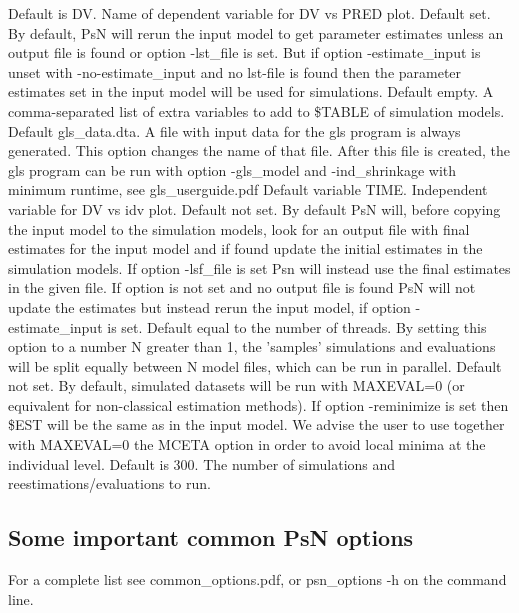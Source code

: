 \begin{optionlist}
Default is DV. Name of dependent variable for DV vs PRED plot.
\nextopt
{}
Default set. By default, PsN will rerun the input model to get parameter estimates unless an output file is found or option -lst\_file is set. But if option -estimate\_input is unset with -no-estimate\_input and no lst-file is found then the parameter estimates set in the input model will be used for simulations. 
\nextopt
{}
Default empty. A comma-separated list of extra variables to add to \$TABLE of simulation models.
\nextopt
{}
Default gls\_data.dta. A file with input data for the gls program is always generated. This option changes the name of that file. After this file is created, the gls program can be run with option \mbox{-gls\_model} and -ind\_shrinkage with minimum runtime, see gls\_userguide.pdf 
\nextopt
{}
Default variable TIME. Independent variable for DV vs idv plot.
\nextopt
{}
Default not set. By default PsN will, before copying the input model to the simulation models, look for an output file with final estimates for the input model and if found update the initial estimates in the simulation models. If option -lsf\_file is set Psn will instead use the final estimates in the given file. If option is not set and no output file is found PsN will not update the estimates but instead rerun the input model, if option -estimate\_input is set. 
\nextopt
{}
Default equal to the number of threads. By setting this option to a number N greater than 1, the 'samples' simulations and evaluations will be split equally between N model files, which can be run in parallel.
\nextopt
{}
Default not set. By default, simulated datasets will be run with MAXEVAL=0 (or equivalent for non-classical estimation methods). If option -reminimize is set then \$EST will be the same as in the input model. We advise the user to use together with MAXEVAL=0 the MCETA option in order to avoid local minima at the individual level.
\nextopt
{}
Default is 300. The number of simulations and reestimations/evaluations to run. 
\nextopt
\end{optionlist}

\subsection{Some important common PsN options}
For a complete list see common\_options.pdf, or psn\_options -h on the command line.


